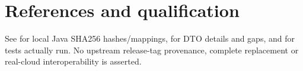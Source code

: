 \documentclass[a4paper]{arrowhead}
\begin{document}
\section{References and qualification}
See  for local Java SHA256 hashes/mappings,  for DTO details and gaps, and  for tests actually run. No upstream release-tag provenance, complete replacement or real-cloud interoperability is asserted.
\end{document}
